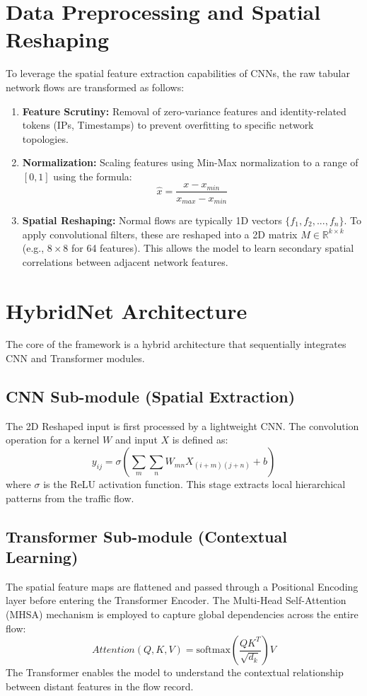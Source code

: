 \documentclass[12pt, a4paper]{report}
\begin{document}
\section{Data Preprocessing and Spatial Reshaping}
To leverage the spatial feature extraction capabilities of CNNs, the raw tabular network flows are transformed as follows:
\begin{enumerate}
    \item \textbf{Feature Scrutiny:} Removal of zero-variance features and identity-related tokens (IPs, Timestamps) to prevent overfitting to specific network topologies.
    \item \textbf{Normalization:} Scaling features using Min-Max normalization to a range of $[0, 1]$ using the formula:
    \begin{equation}
        \hat{x} = \frac{x - x_{min}}{x_{max} - x_{min}}
    \label{eq:norm}
    \end{equation}
    \item \textbf{Spatial Reshaping:} Normal flows are typically 1D vectors $\{f_1, f_2, ..., f_n\}$. To apply convolutional filters, these are reshaped into a 2D matrix $M \in \mathbb{R}^{k \times k}$ (e.g., $8 \times 8$ for 64 features). This allows the model to learn secondary spatial correlations between adjacent network features.
\end{enumerate}

\section{HybridNet Architecture}
The core of the framework is a hybrid architecture that sequentially integrates CNN and Transformer modules.

\subsection{CNN Sub-module (Spatial Extraction)}
The 2D Reshaped input is first processed by a lightweight CNN. The convolution operation for a kernel $W$ and input $X$ is defined as:
\begin{equation}
    y_{ij} = \sigma \left( \sum_{m} \sum_{n} W_{mn} X_{(i+m)(j+n)} + b \right)
\label{eq:conv}
\end{equation}
where $\sigma$ is the ReLU activation function. This stage extracts local hierarchical patterns from the traffic flow.

\subsection{Transformer Sub-module (Contextual Learning)}
The spatial feature maps are flattened and passed through a Positional Encoding layer before entering the Transformer Encoder. The Multi-Head Self-Attention (MHSA) mechanism is employed to capture global dependencies across the entire flow:
\begin{equation}
    Attention(Q,K,V) = \text{softmax} \left( \frac{QK^T}{\sqrt{d_k}} \right) V
\label{eq:attn}
\end{equation}
The Transformer enables the model to understand the contextual relationship between distant features in the flow record.
\end{document}

